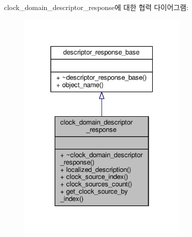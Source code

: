clock\+\_\+domain\+\_\+descriptor\+\_\+response에 대한 협력 다이어그램\+:
\nopagebreak
\begin{figure}[H]
\begin{center}
\leavevmode
\includegraphics[width=232pt]{classavdecc__lib_1_1clock__domain__descriptor__response__coll__graph}
\end{center}
\end{figure}
